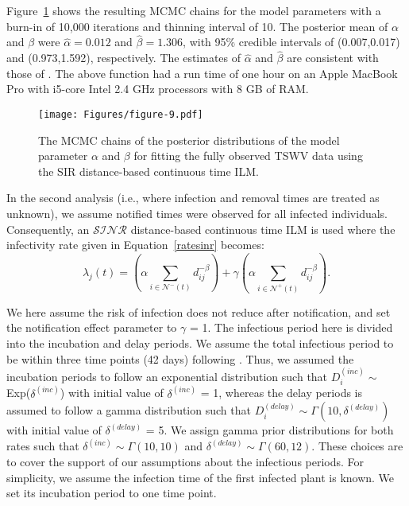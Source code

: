 \documentclass[nojss,shortnames]{jss}
\begin{document}
Figure~\ref{tswv-known-epidemic} shows the resulting MCMC chains for the model parameters with a burn-in of 10,000 iterations and thinning interval of 10. The posterior mean of $\alpha$ and $\beta$ were $\hat{\alpha} = 0.012$ and $\hat{\beta} = 1.306$, with 95\% credible intervals of (0.007,0.017) and (0.973,1.592), respectively. The estimates of $\hat{\alpha}$ and $\hat{\beta}$ are consistent with those of \citet{pokharel2014supervised,pokharel2016gaussian}. The above  function had a run time of one hour on an Apple MacBook Pro with i5-core Intel 2.4 GHz processors with 8 GB of RAM.

\begin{figure}[!h]
\begin{center}
\texttt{[image: Figures/figure-9.pdf]}
\caption{The MCMC chains of the posterior distributions of the model parameter $\alpha$ and $\beta$ for fitting the fully observed TSWV data using the SIR distance-based continuous time ILM.}
\label{tswv-known-epidemic}
\end{center}
\end{figure}

In the second analysis (i.e., where infection and removal times are treated as unknown), we assume notified times were observed for all infected individuals. Consequently, an $\mathcal{SINR}$ distance-based continuous time ILM is used where the infectivity rate given in Equation~\ref{ratesinr} becomes: 
\[
\lambda_{j}(t) = \left(\alpha \sum_{i \in \mathcal{N}^{-}(t)}{d_{ij}^{-\beta}} \right) +  \gamma \left(\alpha \sum_{i \in \mathcal{N}^{+}(t)}{d_{ij}^{-\beta}} \right).
\]

We here assume the risk of infection does not reduce after notification, and set the notification effect parameter to $\gamma$ = 1. The infectious period here is divided into the incubation and delay periods. We assume the total infectious period to be within three time points (42 days) following \citet{pokharel2014supervised,pokharel2016gaussian,brown2005tospoviruses}. Thus, we assumed the incubation periods to follow an exponential distribution such that $D_{i}^{(inc)} \sim$ Exp($\delta^{(inc)}$) with initial value of $\delta^{(inc)}$ = 1, whereas the delay periods is assumed to follow a gamma distribution such that $D_{i}^{(delay)} \sim \Gamma(10,\delta^{(delay)})$ with initial value of $\delta^{(delay)}$ = 5. We assign gamma prior distributions for both rates such that $\delta^{(inc)} \sim \Gamma(10, 10)$ and $\delta^{(delay)} \sim \Gamma(60, 12)$.  These choices are to cover the support of our assumptions about the infectious periods. For simplicity, we assume the infection time of the first infected plant is known. We set its incubation period to one time point.
\end{document}

